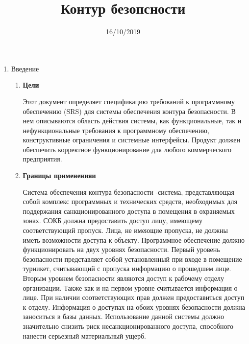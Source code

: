 \documentclass[12pt]{article} %
\title{Контур безопсности} %
\date{16/10/2019} %
\begin{document}
 \maketitle

   \begin{enumerate}

  \item Введение
    \begin{enumerate} 
        \item \begin{large} \textbf{Цели} \end{large} \newline
          Этот документ определяет спецификацию требований к программному обеспечению (SRS) для системы обеспечения контура безопасности. В нем описываются область действия системы, как функциональные, так и нефункциональные требования к программному обеспечению, конструктивные ограничения и системные интерфейсы.
          Продукт должен обеспечить корректное функционирование для любого коммерческого предприятия.

        \item \begin{large} \textbf{Границы примененияи} \end{large} \newline
        Система обеспечения контура безопасности -система, представляющая собой комплекс программных и технических средств, необходимых для поддержания санкционированного доступа в помещения в охраняемых зонах.
        СОКБ должна предоставить доступ лицу, имеющему соответствующий пропуск. Лица, не имеющие пропуска, не должны иметь возможности доступа к объекту.  
        Программное обеспечение должно функционировать на двух уровнях безопасности. Первый уровень безопасности представляет собой установленный при входе в помещение турникет, считывающий с пропуска информацию о прошедшем лице. Вторым уровнем безопасности являются доступ к рабочему отделу организации. Также как и на первом уровне считывается информация о лице. При наличии соответствующих прав должен предоставиться доступ к отделу. Информация о доступах на обоих уровнях безопасности должна заноситься в базы данных. 
        Использование данной системы должно значительно снизить риск несанкционированного доступа, способного нанести серьезный материальный ущерб. 
        

\end{enumerate}
\end{enumerate}
\end{document}

